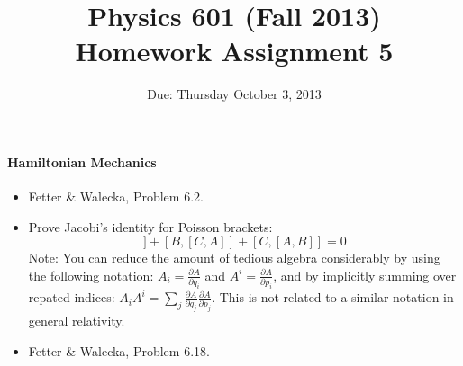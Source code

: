 \documentclass[letterpaper,11pt]{article}
\title{Physics 601 (Fall 2013) \\ Homework Assignment 5}
\date{Due: Thursday October 3, 2013}
\begin{document}
\maketitle

\paragraph*{Hamiltonian Mechanics}
\begin{itemize}
 \item Fetter \& Walecka, Problem 6.2.
 \item Prove Jacobi's identity for Poisson brackets:
 \begin{equation*}
  [A,[B,C]] + [B,[C,A]] + [C,[A,B]] = 0
 \end{equation*}
 Note: You can reduce the amount of tedious algebra considerably by using the following notation: $A_i = \frac{\partial A}{\partial q_i}$ and $A^i = \frac{\partial A}{\partial p_i}$, and by implicitly summing over repated indices: $A_i A^i = \sum_j \frac{\partial A}{\partial q_j} \frac{\partial A}{\partial p_j}$.  This is not related to a similar notation in general relativity.
 \item Fetter \& Walecka, Problem 6.18.
\end{itemize}
\end{document}
